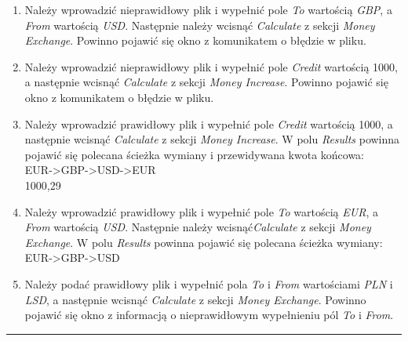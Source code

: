 \documentclass[a4paper,11pt]{article}
\newcommand{\linia}{\rule{\linewidth}{0.4mm}}
\begin{document}
\begin{enumerate}
\item Należy wprowadzić nieprawidłowy plik i wypełnić pole \textit{To} wartością \textit{GBP}, a \textit{From} wartością \textit{USD}. Następnie należy wcisnąć \textit{Calculate} z sekcji \textit{Money Exchange}. Powinno pojawić się okno z komunikatem o błędzie w pliku.
\item Należy wprowadzić nieprawidłowy plik i wypełnić pole \textit{Credit} wartością 1000, a następnie wcisnąć \textit{Calculate} z sekcji \textit{Money Increase}. Powinno pojawić się okno z komunikatem o błędzie w pliku.
\item Należy wprowadzić prawidłowy plik i wypełnić pole \textit{Credit} wartością 1000, a następnie wcisnąć \textit{Calculate} z sekcji \textit{Money Increase}. W polu \textit{Results} powinna pojawić się polecana ścieżka wymiany i przewidywana kwota końcowa:
\\EUR->GBP->USD->EUR
\\1000,29
\item Należy wprowadzić prawidłowy plik i wypełnić pole \textit{To} wartością \textit{EUR}, a \textit{From} wartością \textit{USD}. Następnie należy wcisnąć\textit{Calculate} z sekcji \textit{Money Exchange}. W polu \textit{Results} powinna pojawić się polecana ścieżka wymiany:
\\EUR->GBP->USD
\item Należy podać prawidłowy plik i wypełnić pola \textit{To} i \textit{From} wartościami \textit{PLN} i \textit{LSD}, a następnie wcisnąć \textit{Calculate} z sekcji \textit{Money Exchange}. Powinno pojawić się okno z informacją o nieprawidłowym wypełnieniu pól \textit{To} i \textit{From}.
\end{enumerate}
\noindent\linia
\end{document}
